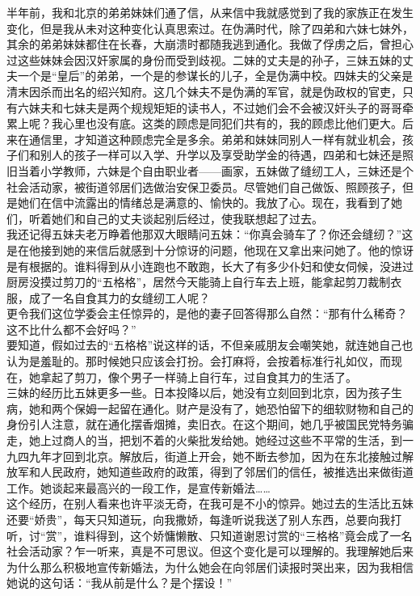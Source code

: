 半年前，我和北京的弟弟妹妹们通了信，从来信中我就感觉到了我的家族正在发生变化，但是我从未对这种变化认真思索过。在伪满时代，除了四弟和六妹七妹外，其余的弟弟妹妹都住在长春，大崩溃时都随我逃到通化。我做了俘虏之后，曾担心过这些妹妹会因汉奸家属的身份而受到歧视。二妹的丈夫是的孙子，三妹五妹的丈夫一个是“皇后”的弟弟，一个是的参谋长的儿子，全是伪满中校。四妹夫的父亲是清末因杀而出名的绍兴知府。这几个妹夫不是伪满的军官，就是伪政权的官吏，只有六妹夫和七妹夫是两个规规矩矩的读书人，不过她们会不会被汉奸头子的哥哥牵累上呢？我心里也没有底。这类的顾虑是同犯们共有的，我的顾虑比他们更大。后来在通信里，才知道这种顾虑完全是多余。弟弟和妹妹同别人一样有就业机会，孩子们和别人的孩子一样可以入学、升学以及享受助学金的待遇，四弟和七妹还是照旧当着小学教师，六妹是个自由职业者——画家，五妹做了缝纫工人，三妹还是个社会活动家，被街道邻居们选做治安保卫委员。尽管她们自己做饭、照顾孩子，但是她们在信中流露出的情绪总是满意的、愉快的。我放了心。现在，我看到了她们，听着她们和自己的丈夫谈起别后经过，使我联想起了过去。\\

我还记得五妹夫老万睁着他那双大眼睛问五妹：“你真会骑车了？你还会缝纫？”这是在他接到她的来信后就感到十分惊讶的问题，他现在又拿出来问她了。他的惊讶是有根据的。谁料得到从小连跑也不敢跑，长大了有多少仆妇和使女伺候，没进过厨房没摸过剪刀的“五格格”，居然今天能骑上自行车去上班，能拿起剪刀裁制衣服，成了一名自食其力的女缝纫工人呢？\\

更令我们这位学委会主任惊异的，是他的妻子回答得那么自然：“那有什么稀奇？这不比什么都不会好吗？”\\

要知道，假如过去的“五格格”说这样的话，不但亲戚朋友会嘲笑她，就连她自己也认为是羞耻的。那时候她只应该会打扮。会打麻将，会按着标准行礼如仪，而现在，她拿起了剪刀，像个男子一样骑上自行车，过自食其力的生活了。\\

三妹的经历比五妹更多一些。日本投降以后，她没有立刻回到北京，因为孩子生病，她和两个保姆一起留在通化。财产是没有了，她恐怕留下的细软财物和自己的身份引人注意，就在通化摆香烟摊，卖旧衣。在这个期间，她几乎被国民党特务骗走，她上过商人的当，把划不着的火柴批发给她。她经过这些不平常的生活，到一九四九年才回到北京。解放后，街道上开会，她不断去参加，因为在东北接触过解放军和人民政府，她知道些政府的政策，得到了邻居们的信任，被推选出来做街道工作。她谈起来最高兴的一段工作，是宣传新婚法……\\

这个经历，在别人看来也许平淡无奇，在我可是不小的惊异。她过去的生活比五妹还要“娇贵”，每天只知道玩，向我撒娇，每逢听说我送了别人东西，总要向我打听，讨“赏”，谁料得到，这个娇慵懒散、只知道谢恩讨赏的“三格格”竟会成了一名社会活动家？乍一听来，真是不可思议。但这个变化是可以理解的。我理解她后来为什么那么积极地宣传新婚法，为什么她会在向邻居们读报时哭出来，因为我相信她说的这句话：“我从前是什么？是个摆设！”\\

